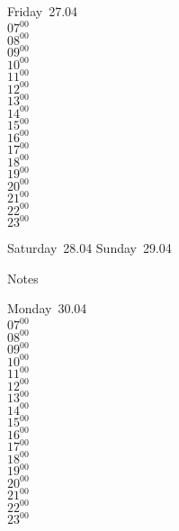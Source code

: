 \documentclass[11pt, a4paper]{book}\usepackage[]{graphicx}\usepackage[]{color}
\begin{document}
\begin{weekdaybox}
  Friday~27.04\\
  { 
  \vfill
  $07^{00}$\\
$08^{00}$\\
$09^{00}$\\
$10^{00}$\\
$11^{00}$\\
$12^{00}$\\
$13^{00}$\\
$14^{00}$\\
$15^{00}$\\
$16^{00}$\\
$17^{00}$\\
$18^{00}$\\
$19^{00}$\\
$20^{00}$\\
$21^{00}$\\
$22^{00}$\\
$23^{00}$\\
  }
\end{weekdaybox}
\begin{weekendbox}
  Saturday~28.04
  \tcblower
  Sunday~29.04
\end{weekendbox} %
\begin{notebox}
  Notes
\end{notebox}
\clearpage
\begin{headerbox}
\end{headerbox}
\begin{weekdaybox}
  Monday~30.04\\
  { 
  \vfill
  $07^{00}$\\
$08^{00}$\\
$09^{00}$\\
$10^{00}$\\
$11^{00}$\\
$12^{00}$\\
$13^{00}$\\
$14^{00}$\\
$15^{00}$\\
$16^{00}$\\
$17^{00}$\\
$18^{00}$\\
$19^{00}$\\
$20^{00}$\\
$21^{00}$\\
$22^{00}$\\
$23^{00}$\\
  }
\end{weekdaybox}
\end{document}
